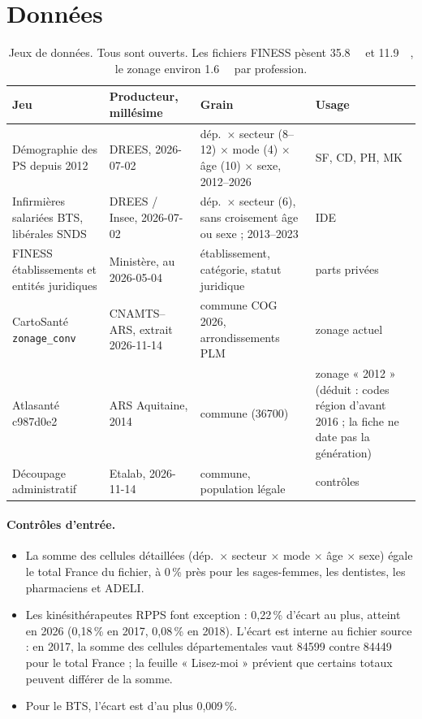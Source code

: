 \documentclass[11pt]{article}
\begin{document}
\section{Données}
\begin{table}[h]
\centering\small
\begin{tabular}{@{}p{4.2cm}p{3.1cm}p{4.3cm}p{3.2cm}@{}}
\toprule
Jeu & Producteur, millésime & Grain & Usage \\
\midrule
Démographie des PS depuis 2012 \citep{drees2026demo} & DREES, 2026-07-02 & dép.\ $\times$ secteur (8--12) $\times$ mode (4) $\times$ âge (10) $\times$ sexe, 2012--2026 & SF, CD, PH, MK \\
Infirmières salariées BTS, libérales SNDS \citep{dreesbts2026} & DREES / Insee, 2026-07-02 & dép.\ $\times$ secteur (6), sans croisement âge ou sexe ; 2013--2023 & IDE \\
FINESS établissements et entités juridiques \citep{finessEt2026,finessEj2026} & Ministère, au 2026-05-04 & établissement, catégorie, statut juridique & parts privées \\
CartoSanté \texttt{zonage\_conv} \citep{cartosante2026} & CNAMTS--ARS, extrait 2026-11-14 & commune COG 2026, arrondissements PLM & zonage actuel \\
Atlasanté c987d0e2 \citep{atlasante2014zonage} & ARS Aquitaine, 2014 & commune (\num{36700}) & zonage « 2012 » (déduit : codes région d'avant 2016 ; la fiche ne date pas la génération) \\
Découpage administratif \citep{geoapi2026} & Etalab, 2026-11-14 & commune, population légale & contrôles \\
\bottomrule
\end{tabular}
\caption{Jeux de données. Tous sont ouverts. Les fichiers FINESS pèsent \SI{35.8}{\mega\byte} et
\SI{11.9}{\mega\byte}\mesure{}, le zonage environ \SI{1.6}{\mega\byte} par profession\mesure{}.}
\label{tab:donnees}
\end{table}

\paragraph{Contrôles d'entrée.}
\begin{itemize}
  \item La somme des cellules détaillées (dép.~$\times$ secteur $\times$ mode $\times$ âge $\times$ sexe) égale
  le total France du fichier, à 0\,\% près\mesure{} pour les sages-femmes, les dentistes, les pharmaciens et
  ADELI.
  \item Les kinésithérapeutes RPPS font exception : 0,22\,\% d'écart au plus\mesure{}, atteint en 2026 (0,18\,\% en
  2017, 0,08\,\% en 2018). L'écart est interne au fichier source : en 2017, la somme des cellules départementales
  vaut \num{84599} contre \num{84449} pour le total France\mesure{} ; la feuille « Lisez-moi » prévient que
  certains totaux peuvent différer de la somme.
  \item Pour le BTS, l'écart est d'au plus 0,009\,\%\mesure{}.
\end{itemize}
\end{document}
